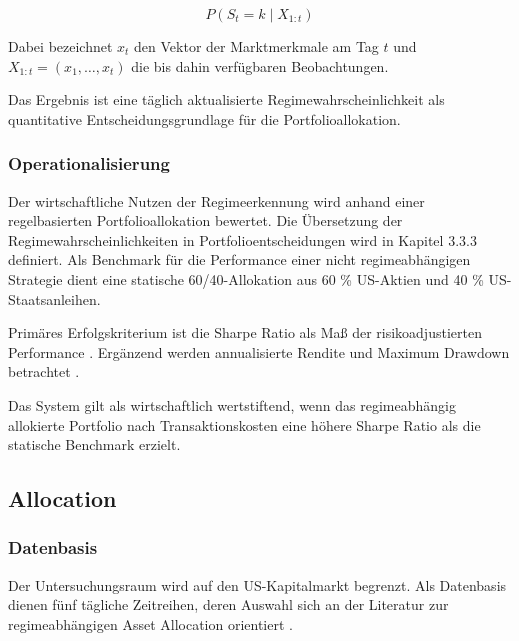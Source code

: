 $$
P(S_t = k \mid X_{1:t})
$$

Dabei bezeichnet $x_t$ den Vektor der Marktmerkmale am Tag $t$ und $X_{1:t}=(x_1,\ldots,x_t)$ die bis dahin verfügbaren Beobachtungen.

\vspace{0.5cm}

Das Ergebnis ist eine täglich aktualisierte Regimewahrscheinlichkeit als quantitative Entscheidungsgrundlage für die Portfolioallokation.

\subsubsection{Operationalisierung}
Der wirtschaftliche Nutzen der Regimeerkennung wird anhand einer regelbasierten Portfolioallokation bewertet. Die Übersetzung der Regimewahrscheinlichkeiten in Portfolioentscheidungen wird in Kapitel 3.3.3 definiert. Als Benchmark für die Performance einer nicht regimeabhängigen Strategie dient eine statische 60/40-Allokation aus 60 \% US-Aktien und 40 \% US-Staatsanleihen. 

\vspace{0.5cm}

Primäres Erfolgskriterium ist die Sharpe Ratio als Maß der risikoadjustierten Performance \cite{noauthor_sharpe_nodate}. Ergänzend werden annualisierte Rendite und Maximum Drawdown betrachtet \cite[19–21]{chekhlov_drawdown_2005}.

\vspace{0.5cm}

Das System gilt als wirtschaftlich wertstiftend, wenn das regimeabhängig allokierte Portfolio nach Transaktionskosten eine höhere Sharpe Ratio als die statische Benchmark erzielt.


\subsection{Allocation}

\subsubsection{Datenbasis}
Der Untersuchungsraum wird auf den US-Kapitalmarkt begrenzt. Als Datenbasis dienen fünf tägliche Zeitreihen, deren Auswahl sich an der Literatur zur regimeabhängigen Asset Allocation orientiert \cite{ang_regime_2012, polavarapu_cross-asset_2026}.

\vspace{0.5cm}

